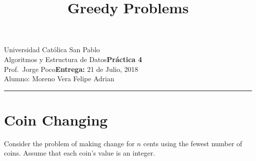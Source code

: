 \documentclass{article}
\title{Greedy Problems}
\date{}
\newcommand{\assignment}{Práctica 4}
\newcommand{\duedate}{21 de Julio, 2018}
\begin{document}
Universidad Católica San Pablo\hfill\\
Algoritmos y Estructura de Datos\hfill\textbf{\assignment}\\
Prof.\ Jorge Poco\hfill\textbf{Entrega:} \duedate\\
Alumno: Moreno Vera Felipe Adrian
\smallskip\hrule\bigskip

{\let\newpage\relax\maketitle}

\section{Coin Changing}
Consider the problem of making change for $n$ cents using the fewest number of coins. Assume that each coin’s value is an integer.
\end{document}

